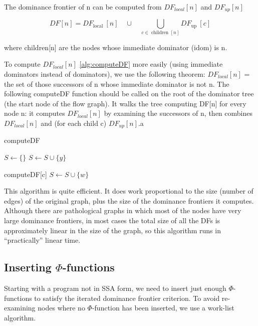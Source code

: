 The dominance frontier of n can be computed from $DF_{local}[n]$  and $DF_{up}[n]$


$$
	D F[n]=D F_{\text {local }}[n] \quad \cup \quad \bigcup_{c \in \text { children }[n]} D F_{\text {up }}[c]
$$

where children[n] are the nodes whose immediate dominator (idom) is n.


To compute $DF_{local}[n]$ \ref{alg:computeDF} more easily (using immediate dominators instead of dominators), we use the following theorem: $DF_{local}[n]$ = the set of those successors of n whose immediate dominator is not n. The following computeDF function should be called on the root of the dominator tree (the start node of the flow graph). It walks the tree computing DF[n] for every node n: it computes $DF_{local}[n]$ by examining the successors of n, then combines $DF_{local}[n]$ and (for each child c) $DF_{up}[n]$.a

\begin{algorithm}
	\caption{computeDF}\label{alg:computeDF}
	\begin{algorithmic}

		\State $S \gets \{\}$
		 
		\State $S\leftarrow S \cup \{y\}$
		\EndIf
		\EndFor

		\State computeDF[c]
		 
		\State $S\leftarrow S \cup \{w\}$
		\EndIf
		\EndFor
		\EndFor
	\end{algorithmic}
\end{algorithm}

This algorithm is quite efficient. It does work proportional to the size (number of edges) of the original graph, plus the size of the dominance frontiers it computes. Although there are pathological graphs in which most of the nodes have very large dominance frontiers, in most cases the total size of all the DFs is approximately linear in the size of the graph, so this algorithm runs in “practically” linear time.




\subsection{Inserting $\Phi$-functions}

Starting with a program not in SSA form, we need to insert just enough $\Phi$-functions to satisfy the iterated dominance frontier criterion. To avoid re-examining nodes where no $\Phi$-function has been inserted, we use a work-list algorithm.

